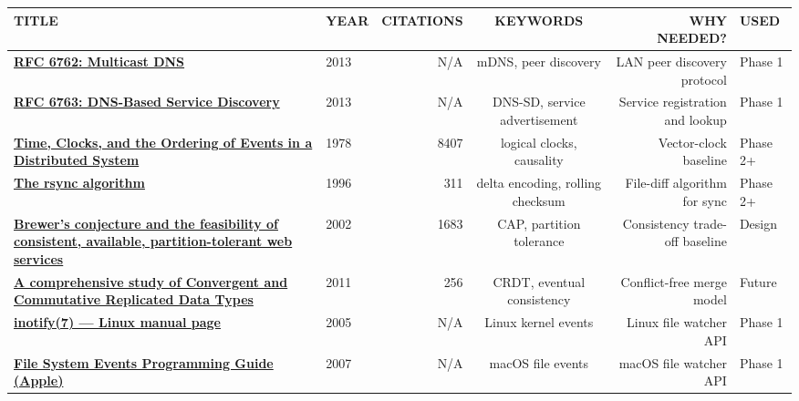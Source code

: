 \documentclass[11pt,oneside]{article}
\begin{document}
\begin{table}[H]
\centering
\renewcommand{\arraystretch}{1.3}
\scriptsize
\begin{tabular}{|L|Y|N|C|D|U|}
\hline
\textbf{TITLE} & \textbf{YEAR} & \textbf{CITATIONS} & \textbf{KEYWORDS} & \textbf{WHY NEEDED?} & \textbf{USED} \\
\hline

\href{https://www.rfc-editor.org/rfc/rfc6762}{\textbf{RFC 6762: Multicast DNS}} & 2013 & N/A &
mDNS, peer discovery & LAN peer discovery protocol & Phase 1 \\
\hline

\href{https://www.rfc-editor.org/rfc/rfc6763}{\textbf{RFC 6763: DNS-Based Service Discovery}} & 2013 & N/A &
DNS-SD, service advertisement & Service registration and lookup & Phase 1 \\
\hline

\href{https://doi.org/10.1145/359545.359563}{\textbf{Time, Clocks, and the Ordering of Events in a Distributed System}} & 1978 & 8407 &
logical clocks, causality & Vector-clock baseline & Phase 2+ \\
\hline

\href{https://rsync.samba.org/tech_report/}{\textbf{The rsync algorithm}} & 1996 & 311 &
delta encoding, rolling checksum & File-diff algorithm for sync & Phase 2+ \\
\hline

\href{https://doi.org/10.1145/564585.564601}{\textbf{Brewer's conjecture and the feasibility of consistent, available, partition-tolerant web services}} & 2002 & 1683 &
CAP, partition tolerance & Consistency trade-off baseline & Design \\
\hline

\href{https://hal.inria.fr/inria-00609399/document}{\textbf{A comprehensive study of Convergent and Commutative Replicated Data Types}} & 2011 & 256 &
CRDT, eventual consistency & Conflict-free merge model & Future \\
\hline

\href{https://man7.org/linux/man-pages/man7/inotify.7.html}{\textbf{inotify(7) --- Linux manual page}} & 2005 & N/A &
Linux kernel events & Linux file watcher API & Phase 1 \\
\hline

\href{https://developer.apple.com/library/archive/documentation/Darwin/Conceptual/FSEvents_ProgGuide/Introduction/Introduction.html}{\textbf{File System Events Programming Guide (Apple)}} & 2007 & N/A &
macOS file events & macOS file watcher API & Phase 1 \\
\hline

\end{tabular}
\end{table}
\end{document}
